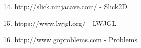 \documentclass{l4proj}
\begin{document}
14. http://slick.ninjacave.com/ - Slick2D

15. https://www.lwjgl.org/ - LWJGL

16. http://www.goproblems.com - Problems



\end{document}
